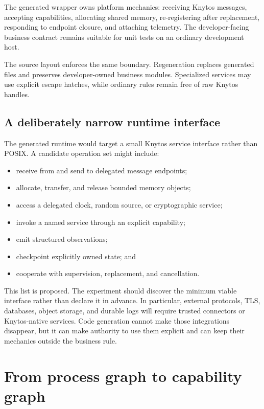 The generated wrapper owns platform mechanics: receiving Knytos messages,
accepting capabilities, allocating shared memory, re-registering after
replacement, responding to endpoint closure, and attaching telemetry. The
developer-facing business contract remains suitable for unit tests on an
ordinary development host.

The source layout enforces the same boundary. Regeneration replaces generated
files and preserves developer-owned business modules. Specialized services may
use explicit escape hatches, while ordinary rules remain free of raw Knytos
handles.

\subsection{A deliberately narrow runtime interface}

The generated runtime would target a small Knytos service interface rather
than POSIX. A candidate operation set might include:

\begin{itemize}
    \item receive from and send to delegated message endpoints;
    \item allocate, transfer, and release bounded memory objects;
    \item access a delegated clock, random source, or cryptographic service;
    \item invoke a named service through an explicit capability;
    \item emit structured observations;
    \item checkpoint explicitly owned state; and
    \item cooperate with supervision, replacement, and cancellation.
\end{itemize}

This list is proposed. The experiment should discover the minimum viable
interface rather than declare it in advance. In particular, external protocols,
TLS, databases, object storage, and durable logs will require trusted connectors
or Knytos-native services. Code generation cannot make those integrations
disappear, but it can make authority to use them explicit and can keep their
mechanics outside the business rule.

\section{From process graph to capability graph}

